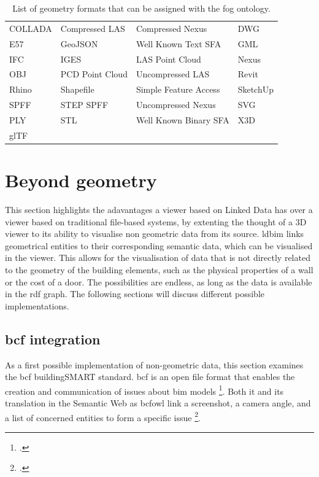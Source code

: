 \begin{table}[H]
    \centering
    \begin{tabular}{llll}
        \toprule
        COLLADA & Compressed LAS  & Compressed Nexus      & DWG      \\
        E57     & GeoJSON         & Well Known Text SFA   & GML      \\
        IFC     & IGES            & LAS Point Cloud       & Nexus    \\
        OBJ     & PCD Point Cloud & Uncompressed LAS      & Revit    \\
        Rhino   & Shapefile       & Simple Feature Access & SketchUp \\
        SPFF    & STEP SPFF       & Uncompressed Nexus    & SVG      \\
        PLY     & STL             & Well Known Binary SFA & X3D      \\
        glTF    &                 &                       &          \\ \bottomrule
    \end{tabular}
    \caption[\acs{fog} ontology geometry formats]{List of geometry formats that can be assigned with the \acs{fog} ontology.\footnotemark}
    \label{tab:geometryFormats}
\end{table}

\section{Beyond geometry} \label{sec:beyondGeometry}
This section highlights the adavantages a viewer based on Linked Data has over a viewer based on traditional file-based systems, by extenting the thought of a 3D viewer to its ability to visualise non geometric data from its source. \ac{ldbim} links geometrical entities to their corresponding semantic data, which can be visualised in the viewer. This allows for the visualisation of data that is not directly related to the geometry of the building elements, such as the physical properties of a wall or the cost of a door. The possibilities are endless, as long as the data is available in the \ac{rdf} graph. The following sections will discuss different possible implementations.


\subsection{\acs{bcf} integration} \label{sec:bcf}
As a first possible implementation of non-geometric data, this section examines the \ac{bcf} buildingSMART standard. \ac{bcf} is an open file format that enables the creation and communication of issues about \ac{bim} models \footcite{bcf}. Both it and its translation in the Semantic Web as \ac{bcfowl} \parencite{bcfOWL} link a screenshot, a camera angle, and a list of concerned entities to form a specific issue \footcite{bcfCollab}.

